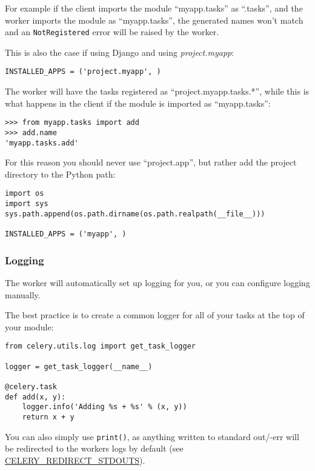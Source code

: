 \documentclass[9pt,a4paper]{article}
\begin{document}
\begin{CJK*}{GBK}{kai}
For example if the client imports the module “myapp.tasks” as “.tasks”, and the worker imports the module as “myapp.tasks”, the generated names won\textquoteright t match and an \verb"NotRegistered" error will be raised by the worker.

This is also the case if using Django and using \textit{project.myapp}:

\begin{Verbatim}[frame=single]
INSTALLED_APPS = ('project.myapp', )
\end{Verbatim}

The worker will have the tasks registered as “project.myapp.tasks.*”, while this is what happens in the client if the module is imported as “myapp.tasks”:

\begin{Verbatim}[frame=single]
>>> from myapp.tasks import add
>>> add.name
'myapp.tasks.add'
\end{Verbatim}

For this reason you should never use “project.app”, but rather add the project directory to the Python path:

\begin{Verbatim}[frame=single]
import os
import sys
sys.path.append(os.path.dirname(os.path.realpath(__file__)))

INSTALLED_APPS = ('myapp', )
\end{Verbatim}

\subsubsection{Logging}
The worker will automatically set up logging for you, or you can configure logging manually.

The best practice is to create a common logger for all of your tasks at the top of your module:

\begin{Verbatim}[frame=single]
from celery.utils.log import get_task_logger

logger = get_task_logger(__name__)

@celery.task
def add(x, y):
    logger.info('Adding %s + %s' % (x, y))
    return x + y
\end{Verbatim}

You can also simply use \verb"print()", as anything written to standard out/-err will be redirected to the workers logs by default (see \href{http://docs.celeryproject.org/en/latest/configuration.html#std:setting-CELERY_REDIRECT_STDOUTS}{CELERY\_REDIRECT\_STDOUTS}).


\end{CJK*}
\end{document}

